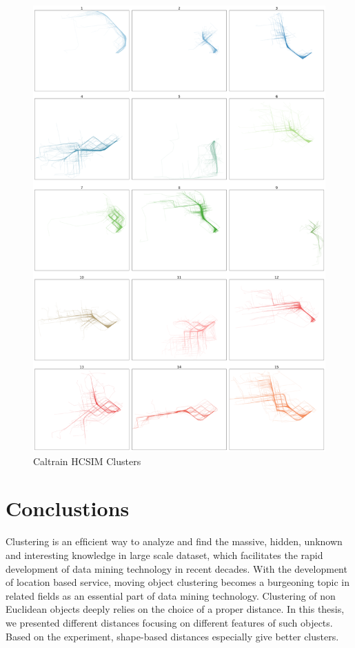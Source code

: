 \documentclass[a4paper, 12pt]{article}
\begin{document}
\begin{figure}[htbp!]
    \centering
    \includegraphics[width=1\textwidth]{Caltrain HCSIM.png}
    \caption{Caltrain HCSIM Clusters}
    \label{fig40}
\end{figure}

\pagebreak

\section{Conclustions}
Clustering is an efﬁcient way to analyze and ﬁnd the massive, hidden,  unknown and interesting knowledge in large scale dataset, which facilitates the rapid development of data mining technology in recent decades. With the development of location based service, moving object
clustering becomes a burgeoning topic in related ﬁelds as an essential part of data mining technology. Clustering of non Euclidean objects deeply relies on the choice of a proper distance. In this thesis, we presented different distances focusing on different features of such objects. Based on the experiment, shape-based distances especially give better clusters.

\pagebreak


\end{document}

